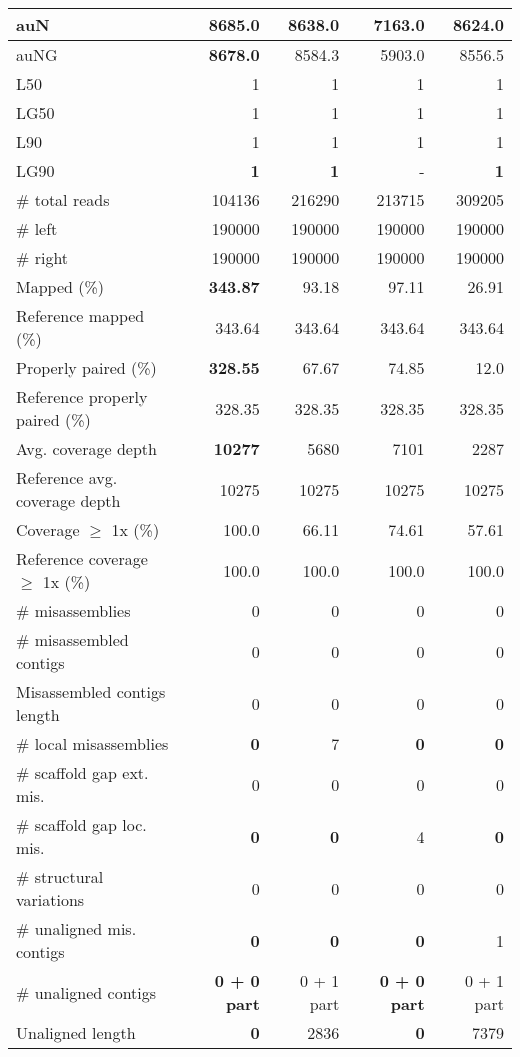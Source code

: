 \documentclass[12pt,a4paper]{article}
\begin{document}
\begin{table}[ht]
\begin{center}
\begin{tabular}{|l*{4}{|r}|}
auN & {\bf 8685.0} & 8638.0 & 7163.0 & 8624.0 \\ \hline
auNG & {\bf 8678.0} & 8584.3 & 5903.0 & 8556.5 \\ \hline
L50 & 1 & 1 & 1 & 1 \\ \hline
LG50 & 1 & 1 & 1 & 1 \\ \hline
L90 & 1 & 1 & 1 & 1 \\ \hline
LG90 & {\bf 1} & {\bf 1} & - & {\bf 1} \\ \hline
\# total reads & 104136 & 216290 & 213715 & 309205 \\ \hline
\# left & 190000 & 190000 & 190000 & 190000 \\ \hline
\# right & 190000 & 190000 & 190000 & 190000 \\ \hline
Mapped (\%) & {\bf 343.87} & 93.18 & 97.11 & 26.91 \\ \hline
Reference mapped (\%) & 343.64 & 343.64 & 343.64 & 343.64 \\ \hline
Properly paired (\%) & {\bf 328.55} & 67.67 & 74.85 & 12.0 \\ \hline
Reference properly paired (\%) & 328.35 & 328.35 & 328.35 & 328.35 \\ \hline
Avg. coverage depth & {\bf 10277} & 5680 & 7101 & 2287 \\ \hline
Reference avg. coverage depth & 10275 & 10275 & 10275 & 10275 \\ \hline
Coverage $\geq$ 1x (\%) & 100.0 & 66.11 & 74.61 & 57.61 \\ \hline
Reference coverage $\geq$ 1x (\%) & 100.0 & 100.0 & 100.0 & 100.0 \\ \hline
\# misassemblies & 0 & 0 & 0 & 0 \\ \hline
\# misassembled contigs & 0 & 0 & 0 & 0 \\ \hline
Misassembled contigs length & 0 & 0 & 0 & 0 \\ \hline
\# local misassemblies & {\bf 0} & 7 & {\bf 0} & {\bf 0} \\ \hline
\# scaffold gap ext. mis. & 0 & 0 & 0 & 0 \\ \hline
\# scaffold gap loc. mis. & {\bf 0} & {\bf 0} & 4 & {\bf 0} \\ \hline
\# structural variations & 0 & 0 & 0 & 0 \\ \hline
\# unaligned mis. contigs & {\bf 0} & {\bf 0} & {\bf 0} & 1 \\ \hline
\# unaligned contigs & {\bf 0 + 0 part} & 0 + 1 part & {\bf 0 + 0 part} & 0 + 1 part \\ \hline
Unaligned length & {\bf 0} & 2836 & {\bf 0} & 7379 \\ \hline

\end{tabular}
\end{center}
\end{table}
\end{document}
